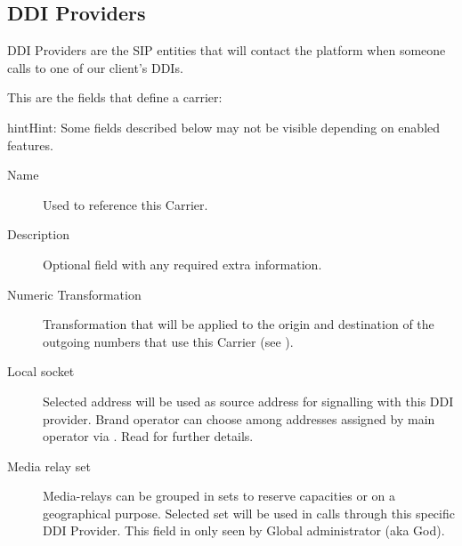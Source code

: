 \documentclass[letterpaper,10pt,english]{sphinxmanual}
\begin{document}
\subsection{DDI Providers}
\label{administration_portal/brand/providers/ddi_providers:ddi-providers}\label{administration_portal/brand/providers/ddi_providers::doc}
DDI Providers are the SIP entities that will contact the platform when someone calls to one of our client's DDIs.

This are the fields that define a carrier:

\begin{notice}{hint}{Hint:}
Some fields described below may not be visible depending on enabled features.
\end{notice}
\begin{description}
\item[{Name}] \leavevmode{}\label{administration_portal/brand/providers/ddi_providers:term-name}
Used to reference this Carrier.

\item[{Description}] \leavevmode{}\label{administration_portal/brand/providers/ddi_providers:term-description}
Optional field with any required extra information.

\item[{Numeric Transformation}] \leavevmode{}\label{administration_portal/brand/providers/ddi_providers:term-numeric-transformation}
Transformation that will be applied to the origin and destination of the
outgoing numbers that use this Carrier
(see {\hyperref[administration_portal/brand/settings/numeric_transformations:numeric\string-transformations]{}}).

\item[{Local socket}] \leavevmode{}\label{administration_portal/brand/providers/ddi_providers:term-local-socket}
Selected address will be used as source address for signalling with this DDI provider. Brand operator can choose among
addresses assigned by main operator via {\hyperref[administration_portal/platform/brands:brands]{}}. Read {\hyperref[administration_portal/platform/infrastructure/proxy_trunks:proxy\string-trunks]{}} for further details.

\item[{Media relay set}] \leavevmode{}\label{administration_portal/brand/providers/ddi_providers:term-media-relay-set}
Media-relays can be grouped in sets to reserve capacities or on a geographical purpose. Selected set will be used
in calls through this specific DDI Provider. This field in only seen by Global administrator (aka God).

\end{description}
\end{document}
